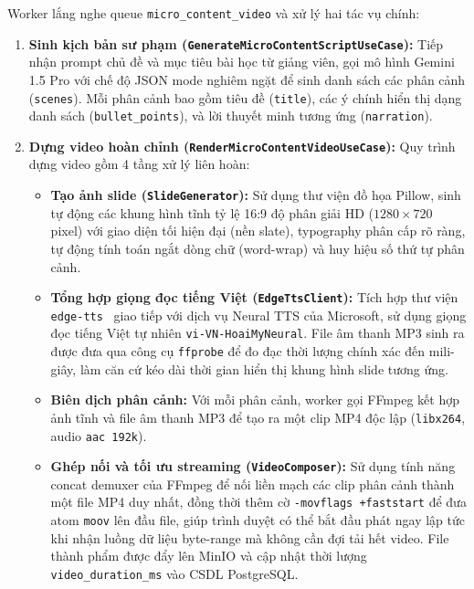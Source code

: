 Worker lắng nghe queue \texttt{micro\_content\_video} và xử lý hai tác vụ chính:
\begin{enumerate}
    \item \textbf{Sinh kịch bản sư phạm (\texttt{GenerateMicroContentScriptUseCase}):}
          Tiếp nhận prompt chủ đề và mục tiêu bài học từ giảng viên, gọi mô hình Gemini 1.5 Pro với chế độ JSON mode nghiêm ngặt để sinh danh sách các phân cảnh (\texttt{scenes}). Mỗi phân cảnh bao gồm tiêu đề (\texttt{title}), các ý chính hiển thị dạng danh sách (\texttt{bullet\_points}), và lời thuyết minh tương ứng (\texttt{narration}).
    \item \textbf{Dựng video hoàn chỉnh (\texttt{RenderMicroContentVideoUseCase}):}
          Quy trình dựng video gồm 4 tầng xử lý liên hoàn:
          \begin{itemize}
              \item \textbf{Tạo ảnh slide (\texttt{SlideGenerator}):} Sử dụng thư viện đồ họa Pillow, sinh tự động các khung hình tĩnh tỷ lệ 16:9 độ phân giải HD ($1280 \times 720$ pixel) với giao diện tối hiện đại (nền slate), typography phân cấp rõ ràng, tự động tính toán ngắt dòng chữ (word-wrap) và huy hiệu số thứ tự phân cảnh.
              \item \textbf{Tổng hợp giọng đọc tiếng Việt (\texttt{EdgeTtsClient}):} Tích hợp thư viện \texttt{edge-tts}~\cite{microsoft_edgetts} giao tiếp với dịch vụ Neural TTS của Microsoft, sử dụng giọng đọc tiếng Việt tự nhiên \texttt{vi-VN-HoaiMyNeural}. File âm thanh MP3 sinh ra được đưa qua công cụ \texttt{ffprobe} để đo đạc thời lượng chính xác đến mili-giây, làm căn cứ kéo dài thời gian hiển thị khung hình slide tương ứng.
              \item \textbf{Biên dịch phân cảnh:} Với mỗi phân cảnh, worker gọi FFmpeg kết hợp ảnh tĩnh và file âm thanh MP3 để tạo ra một clip MP4 độc lập (\texttt{libx264}, audio \texttt{aac 192k}).
              \item \textbf{Ghép nối và tối ưu streaming (\texttt{VideoComposer}):} Sử dụng tính năng concat demuxer của FFmpeg để nối liền mạch các clip phân cảnh thành một file MP4 duy nhất, đồng thời thêm cờ \texttt{-movflags +faststart} để đưa atom \texttt{moov} lên đầu file, giúp trình duyệt có thể bắt đầu phát ngay lập tức khi nhận luồng dữ liệu byte-range mà không cần đợi tải hết video. File thành phẩm được đẩy lên MinIO và cập nhật thời lượng \texttt{video\_duration\_ms} vào CSDL PostgreSQL.
          \end{itemize}
\end{enumerate}

